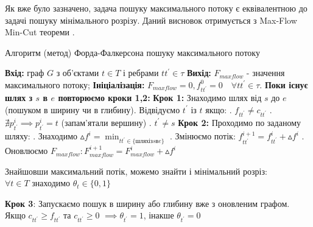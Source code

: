 Як вже було зазначено,
задача пошуку максимального потоку є еквівалентною до задачі пошуку мінімального розрізу.
Даний висновок отримується з Max-Flow Min-Cut теореми \cite{ford_fulkerson,edmods_karp}.
\begin{algorithm}[H]
    \caption{Алгоритм (метод) Форда-Фалкерсона пошуку максимального потоку}
    \begin{algorithmic}
        \State \textbf{Вхід:} граф $G$ з об'єктами $ t \in T $ і ребрами $tt^{'} \in \tau$
        \State \textbf{Вихід:} $ F_{maxflow} $ - значення максимального потоку;
        \State \textbf{Ініціалізація:} $ F_{maxflow} = 0, f_{tt^{'}}^{0} = 0 \quad \forall tt^{'}  \in \tau $.
        \State \textbf{Поки існує шлях з $s$ в $e$ повторюємо кроки 1,2:}
        \State \textbf{Крок 1:} Знаходимо шлях від $s$ до $e$ (пошуком в ширину чи в глибину).
        \State Відвідуємо $ t^{'}$ із $t $ якщо:
        \State {}. $ f_{tt^{'}} \neq c_{tt^{'}} $
        \State {}. $ \nexists p_{t^{'}}^{i} \implies p_{t^{'}}^{i} = t $ (запам'ятали вершину)
        \State {}. $ t^{'} \neq s $
        \State \textbf{Крок 2:} Проходимо по заданому шляху:
        \State {}. Знаходимо $ \vartriangle f^{i} = \min_{tt^{'} \in \{шлях із s в e \}} $
        \State {}. Змінюємо потік: $ f_{tt^{'}}^{i+1} = f_{tt^{'}}^{i} + \vartriangle f^{i} $
        \State {}. Оновлюємо $ F_{maxflow}: F_{maxflow}^{i+1} = F_{maxflow}^{i} + \vartriangle f^{i} $
    \end{algorithmic}

    Знайшовши максимальний потік, можемо знайти і мінімальний розріз: \\
    $\forall t \in T$ знаходимо $\theta_{t} \in \{0,1\}$
    \begin{algorithmic}
        \State \textbf{Крок 3}: Запускаємо пошук в ширину або глибину вже з оновленим графом.
        \State \qquad Якщо $c_{tt^{'}} \geqslant f_{tt^{'}}$ та $c_{tt^{'}} \geqslant 0$
        $\implies \theta_{t^{'}} = 1 $, інакше $\theta_{t^{'}} = 0 $
    \end{algorithmic}
\end{algorithm}

